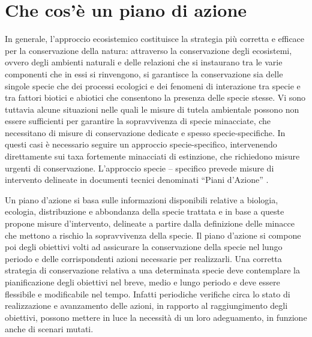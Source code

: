 \documentclass[10pt,twoside,openany,x11names,svgnames,italian,a5paper,dvipsnames,table]{memoir}
\newcommand\chapterillustration{}
\begin{document}
\chapter{Che cos'\`e un piano di azione}
\renewcommand\chapterillustration{}
\footnotesize
\vspace{.2cm}
In generale, l'approccio ecosistemico costituisce la strategia più corretta e efficace per la conservazione della natura: attraverso la conservazione degli ecosistemi, ovvero degli ambienti naturali e delle relazioni che si instaurano tra le varie componenti che in essi si rinvengono, si garantisce la conservazione sia delle singole specie che dei processi ecologici e dei fenomeni di interazione tra specie e tra fattori biotici e abiotici che consentono la presenza delle specie stesse.
Vi sono tuttavia alcune situazioni nelle quali le misure di tutela ambientale possono non essere sufficienti per garantire la sopravvivenza di specie minacciate, che necessitano di misure di conservazione dedicate e spesso specie-specifiche. In questi casi è necessario seguire un approccio specie-specifico, intervenendo direttamente sui taxa fortemente minacciati di estinzione, che richiedono misure urgenti di conservazione. L’approccio specie – specifico prevede misure di intervento delineate in documenti tecnici denominati “Piani d’Azione” \cite{EUCOUNCIL98}.

Un piano d’azione si basa sulle informazioni disponibili relative a biologia, ecologia, distribuzione e abbondanza della specie trattata e in base a queste propone misure d’intervento, delineate a partire dalla definizione delle minacce che mettono a rischio la sopravvivenza della specie. Il piano d’azione si compone poi degli obiettivi volti ad assicurare la conservazione della specie nel lungo periodo e delle corrispondenti azioni necessarie per realizzarli.
Una corretta strategia di conservazione relativa a una determinata specie deve contemplare la pianificazione degli obiettivi nel breve, medio e lungo periodo e deve essere flessibile e modificabile nel tempo. Infatti periodiche verifiche circa lo stato di realizzazione e avanzamento delle azioni, in rapporto al raggiungimento degli obiettivi, possono mettere in luce la necessità di un loro adeguamento, in funzione anche di scenari mutati.
\end{document}
